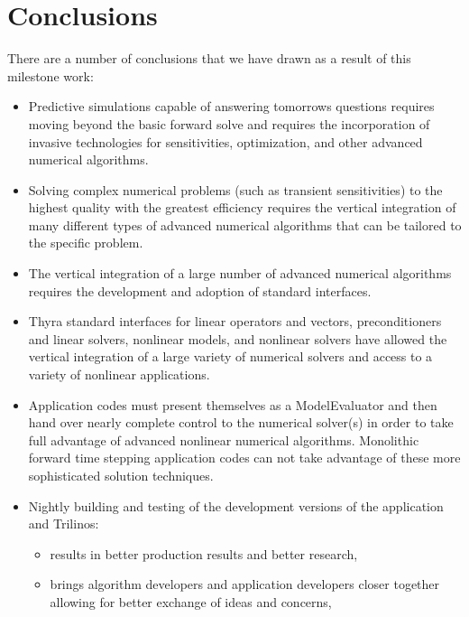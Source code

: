 \documentclass[pdf,ps2pdf,11pt]{SANDreport}
\begin{document}
%
\section{Conclusions}
%

There are a number of conclusions that we have drawn as a result of this
milestone work:

\begin{itemize}

{}\item Predictive simulations capable of answering tomorrows questions
requires moving beyond the basic forward solve and requires the incorporation
of invasive technologies for sensitivities, optimization, and other advanced
numerical algorithms.

{}\item Solving complex numerical problems (such as transient sensitivities)
to the highest quality with the greatest efficiency requires the vertical
integration of many different types of advanced numerical algorithms that can
be tailored to the specific problem.

{}\item The vertical integration of a large number of advanced numerical
algorithms requires the development and adoption of standard interfaces.

{}\item Thyra standard interfaces for linear operators and vectors,
preconditioners and linear solvers, nonlinear models, and nonlinear solvers
have allowed the vertical integration of a large variety of numerical solvers
and access to a variety of nonlinear applications.

{}\item Application codes must present themselves as a ModelEvaluator and then
hand over nearly complete control to the numerical solver(s) in order to take
full advantage of advanced nonlinear numerical algorithms.  Monolithic forward
time stepping application codes can not take advantage of these more
sophisticated solution techniques.

{}\item Nightly building and testing of the development versions of the
application and Trilinos:

  \begin{itemize}

  {}\item results in better production results and better research,

  {}\item brings algorithm developers and application developers closer
  together allowing for better exchange of ideas and concerns,


\end{itemize}
\end{itemize}
\end{document}
